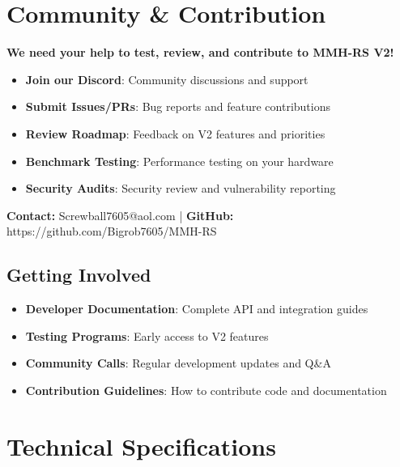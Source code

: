\documentclass[12pt,a4paper]{article}
\makeatletter
\newcommand{\email}{Screwball7605@aol.com}
\newcommand{\github}{https://github.com/Bigrob7605/MMH-RS}
\makeatother
\begin{document}
\section{Community \& Contribution}

\begin{tcolorbox}[colback=orange!10,colframe=orange!50,title=\textbf{Help Us Build MMH-RS V2}]
\textbf{We need your help to test, review, and contribute to MMH-RS V2!}

\begin{itemize}
    \item \textbf{Join our Discord}: Community discussions and support
    \item \textbf{Submit Issues/PRs}: Bug reports and feature contributions
    \item \textbf{Review Roadmap}: Feedback on V2 features and priorities
    \item \textbf{Benchmark Testing}: Performance testing on your hardware
    \item \textbf{Security Audits}: Security review and vulnerability reporting
\end{itemize}

\textbf{Contact:} \email{} | \textbf{GitHub:} \github
\end{tcolorbox}

\subsection{Getting Involved}
\begin{itemize}
    \item \textbf{Developer Documentation}: Complete API and integration guides
    \item \textbf{Testing Programs}: Early access to V2 features
    \item \textbf{Community Calls}: Regular development updates and Q\&A
    \item \textbf{Contribution Guidelines}: How to contribute code and documentation
\end{itemize}

\section{Technical Specifications}
\end{document}
